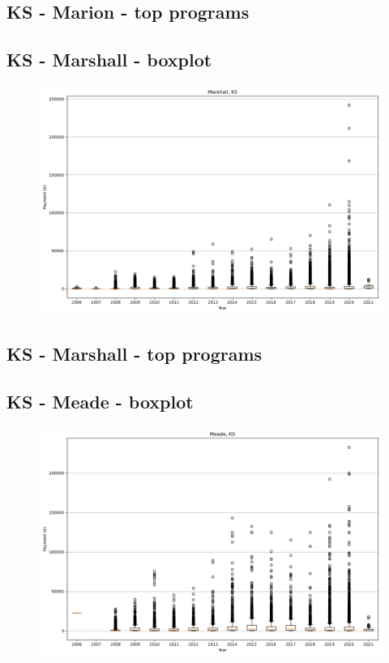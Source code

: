 \subsection*{KS - Marion - top programs}

\newpage
\subsection*{KS - Marshall - boxplot}
\begin{figure}[h]
\centering
\includegraphics[width=7in]{../output/boxplots/counties/Marshall-KS_boxplot.png}
\end{figure}


\subsection*{KS - Marshall - top programs}

\newpage
\subsection*{KS - Meade - boxplot}
\begin{figure}[h]
\centering
\includegraphics[width=7in]{../output/boxplots/counties/Meade-KS_boxplot.png}
\end{figure}


